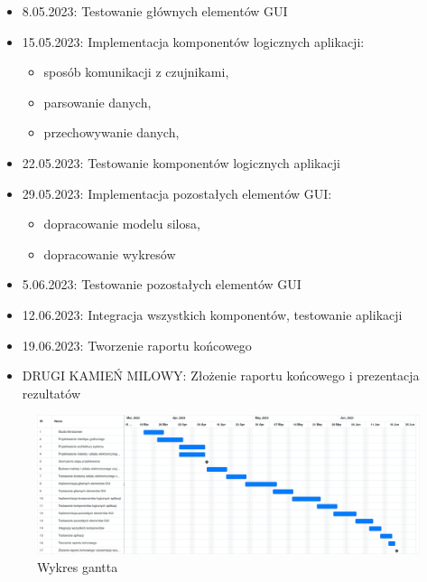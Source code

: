\begin{itemize}
    \item 
        8.05.2023: Testowanie głównych elementów GUI
    \item 
        15.05.2023: Implementacja komponentów logicznych aplikacji:
        \begin{itemize}
            \item sposób komunikacji z czujnikami,
            \item parsowanie danych,
            \item przechowywanie danych,
        \end{itemize}
    \item 
        22.05.2023: Testowanie komponentów logicznych aplikacji
    \item 
        29.05.2023: Implementacja pozostałych elementów GUI:
        \begin{itemize}
            \item dopracowanie modelu silosa,
            \item dopracowanie wykresów
        \end{itemize}
    \item 
        5.06.2023: Testowanie pozostałych elementów GUI
    \item 
        12.06.2023: Integracja wszystkich komponentów, testowanie aplikacji
    \item 
        19.06.2023: Tworzenie raportu końcowego
    \item DRUGI KAMIEŃ MILOWY:  Złożenie raportu końcowego i prezentacja rezultatów
\end{itemize}

\begin{figure}
    \centering
    \includegraphics[width = \textheight, angle = 270]{obrazy/wsd_gantt.png}
    \caption{Wykres gantta}
    \label{fig: gantt}
\end{figure}
